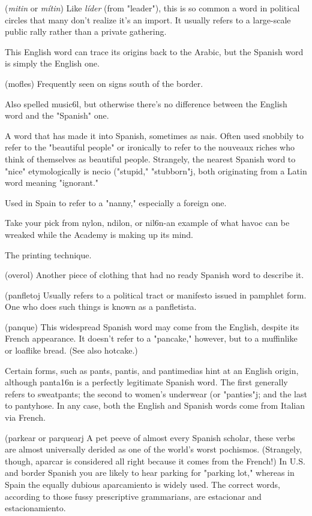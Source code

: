  (\emph{mitin} or \emph{mítin}) Like \emph{líder} (from "leader"), this is
so common a word in political circles that many don't realize it's an
import. It usually refers to a large-scale public rally rather than a private gathering.

 This English word can trace its origins back to the
Arabic, but the Spanish word is simply the English one.

 (mofles) Frequently seen on signs south of the
border.

 Also spelled music6l, but otherwise there's no
difference between the English word and the "Spanish" one.

 A word that has made it into Spanish, sometimes as
nais. Often used snobbily to refer to the "beautiful people" or ironically to refer to the nouveaux riches who think of themselves as beautiful people. Strangely, the nearest Spanish word to "nice" etymologically is necio ("stupid," "stubborn"j, both originating from a Latin
word meaning "ignorant."

 Used in Spain to refer to a "nanny," especially a foreign one.

 Take your pick from nylon, ndilon, or nil6n-an example of what havoc can be wreaked while the Academy is making up
its mind.

 The printing technique.

 (overol) Another piece of clothing that had no
ready Spanish word to describe it.

 (panfletoj Usually refers to a political tract or manifesto issued in pamphlet form. One who does such things is known as
a panfletista.

 (panque) This widespread Spanish word may come
from the English, despite its French appearance. It doesn't refer to a
"pancake," however, but to a muffinlike or loaflike bread. (See also
hotcake.)

 Certain forms, such as pants, pantis, and pantimedias hint at an English origin, although panta16n is a perfectly legitimate Spanish word. The first generally refers to sweatpants; the second to women's underwear (or "panties"j; and the last to pantyhose.
In any case, both the English and Spanish words come from Italian via
French.

 (parkear or parquearj A pet peeve of almost every
Spanish scholar, these verbs are almost universally derided as one of
the world's worst pochismos. (Strangely, though, aparcar is considered
all right because it comes from the French!) In U.S. and border Spanish
you are likely to hear parking for "parking lot," whereas in Spain the
equally dubious aparcamiento is widely used. The correct words, according to those fussy prescriptive grammarians, are estacionar and
estacionamiento.

